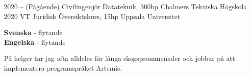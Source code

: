 \documentclass[9pt]{developercv} %
\begin{document}


\begin{entrylist}
	\entry
		{2020 -- }
		{(Pågående) Civilingenjör Datateknik, 300hp}
		{Chalmers Tekniska Högskola}
		{}
	\entry
		{2020 VT}
		{Juridisk Översiktskurs, 15hp}
		{Uppsala Universitet}
		{}
\end{entrylist}


\begin{minipage}[t]{0.3\textwidth}
	\vspace{-\baselineskip} %


	\textbf{Svenska} - flytande\\
	\textbf{Engelska} - flytande
\end{minipage}
\hfill
\begin{minipage}[t]{0.6\textwidth}
	\vspace{-\baselineskip} %
	
	
	På helger tar jag ofta alldeles för långa skogsprommenader och jobbar
	på att implementera programspråket Artemis.
\end{minipage}

\end{document}
